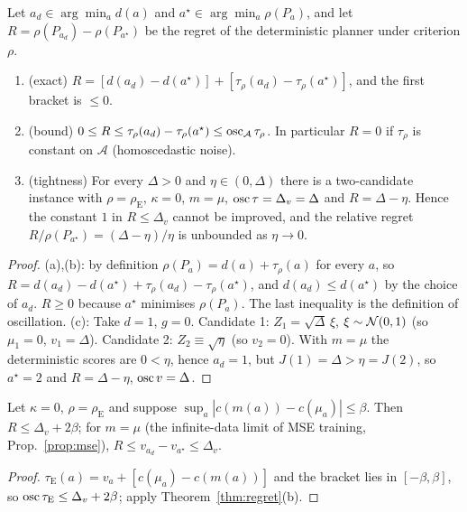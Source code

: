 \begin{theorem}\label{thm:regret}
Let $a_d\in\arg\min_a d(a)$ and $a^\star\in\arg\min_a\rho(P_a)$, and let $R=\rho(P_{a_d})-\rho(P_{a^\star})$ be the regret of the deterministic planner under criterion $\rho$.
\begin{enumerate}
\item[(a)] (exact) $R=[d(a_d)-d(a^\star)]+[\tau_\rho(a_d)-\tau_\rho(a^\star)]$, and the first bracket is $\le0$.
\item[(b)] (bound) $0\le R\le \tau_\rho(a_d)-\tau_\rho(a^\star)\le\operatorname{osc}_{\mathcal A}\tau_\rho$. In particular $R=0$ if $\tau_\rho$ is constant on $\mathcal A$ (homoscedastic noise).
\item[(c)] (tightness) For every $\Delta>0$ and $\eta\in(0,\Delta)$ there is a two-candidate instance with $\rho=\rho_{\mathrm E}$, $\kappa=0$, $m=\mu$, $\operatorname{osc}\tau=\Delta_v=\Delta$ and $R=\Delta-\eta$. Hence the constant $1$ in $R\le\Delta_v$ cannot be improved, and the relative regret $R/\rho(P_{a^\star})=(\Delta-\eta)/\eta$ is unbounded as $\eta\to0$.
\end{enumerate}
\end{theorem}
\begin{proof}
(a),(b): by definition $\rho(P_a)=d(a)+\tau_\rho(a)$ for every $a$, so $R=d(a_d)-d(a^\star)+\tau_\rho(a_d)-\tau_\rho(a^\star)$, and $d(a_d)\le d(a^\star)$ by the choice of $a_d$. $R\ge0$ because $a^\star$ minimises $\rho(P_a)$. The last inequality is the definition of oscillation.
(c): Take $d=1$, $g=0$. Candidate 1: $Z_1=\sqrt\Delta\,\xi$, $\xi\sim\mathcal{N}(0,1)$ (so $\mu_1=0$, $v_1=\Delta$). Candidate 2: $Z_2\equiv\sqrt\eta$ (so $v_2=0$). With $m=\mu$ the deterministic scores are $0<\eta$, hence $a_d=1$, but $J(1)=\Delta>\eta=J(2)$, so $a^\star=2$ and $R=\Delta-\eta$, $\operatorname{osc} v=\Delta$.
\end{proof}

\begin{corollary}\label{cor:expected}
Let $\kappa=0$, $\rho=\rho_{\mathrm E}$ and suppose $\sup_a|c(m(a))-c(\mu_a)|\le\beta$. Then $R\le\Delta_v+2\beta$; for $m=\mu$ (the infinite-data limit of MSE training, Prop.~\ref{prop:mse}), $R\le v_{a_d}-v_{a^\star}\le\Delta_v$.
\end{corollary}
\begin{proof}
$\tau_{\mathrm E}(a)=v_a+[c(\mu_a)-c(m(a))]$ and the bracket lies in $[-\beta,\beta]$, so $\operatorname{osc}\tau_{\mathrm E}\le\Delta_v+2\beta$; apply Theorem~\ref{thm:regret}(b).
\end{proof}

